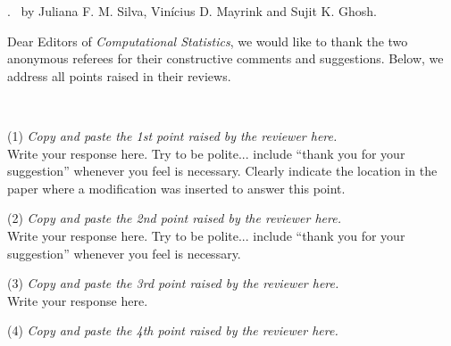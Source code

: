 \documentclass[a4,12pt]{article}
\begin{document}
. \ by Juliana F. M. Silva, Vin\'icius D. Mayrink and Sujit K. Ghosh. \\

\vspace{10pt}

Dear Editors of \textit{Computational Statistics}, we would like to thank the two anonymous referees for their constructive comments and suggestions. Below, we address all points raised in their reviews. \\

\vspace{10pt}

 \\

\vspace{5pt}

\noindent (1) \emph{ \color{blue} Copy and paste the 1st point raised by the reviewer here.} \\

Write your response here. Try to be polite... include ``thank you for your suggestion'' whenever you feel is necessary. Clearly indicate the location in the paper where a modification was inserted to answer this point.  \\

\vspace{10pt}

\noindent (2) \emph{ \color{blue} Copy and paste the 2nd point raised by the reviewer here.} \\

Write your response here. Try to be polite... include ``thank you for your suggestion'' whenever you feel is necessary. \\

\vspace{10pt}

\noindent (3) \emph{ \color{blue} Copy and paste the 3rd point raised by the reviewer here.} \\

Write your response here. \\

\vspace{10pt}

\noindent (4) \emph{ \color{blue} Copy and paste the 4th point raised by the reviewer here.} \\
\end{document}
